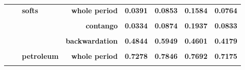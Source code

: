 \documentclass[
  authoryear,
  preprint,
  3p]{elsarticle}
\begin{document}
\begin{longtable}[t]{>{}l>{}l>{}l>{}r>{}r>{}r>{}r>{}r}
\addlinespace
\textbf{} & \textbf{} & \textbf{softs} & \textbf{whole period} & \textcolor[HTML]{4285f4}{\textbf{0.0391}} & \textcolor[HTML]{4285f4}{\textbf{0.0853}} & \textcolor[HTML]{4285f4}{\textbf{0.1584}} & \textcolor[HTML]{4285f4}{\textbf{0.0764}}\\
\textbf{\cellcolor{gray!10}{}} & \textbf{\cellcolor{gray!10}{}} & \textbf{\cellcolor{gray!10}{}} & \textbf{\cellcolor{gray!10}{backwardation}} & \textcolor[HTML]{4285f4}{\textbf{\cellcolor{gray!10}{0.0437}}} & \textcolor[HTML]{4285f4}{\textbf{\cellcolor{gray!10}{0.0845}}} & \textcolor[HTML]{4285f4}{\textbf{\cellcolor{gray!10}{0.1210}}} & \textcolor[HTML]{4285f4}{\textbf{\cellcolor{gray!10}{0.0685}}}\\
\textbf{} & \textbf{} & \textbf{} & \textbf{contango} & \textcolor[HTML]{4285f4}{\textbf{0.0334}} & \textcolor[HTML]{4285f4}{\textbf{0.0874}} & \textcolor[HTML]{4285f4}{\textbf{0.1937}} & \textcolor[HTML]{4285f4}{\textbf{0.0833}}\\
\textbf{\cellcolor{gray!10}{}} & \textbf{\cellcolor{gray!10}{energy}} & \textbf{\cellcolor{gray!10}{all}} & \textbf{\cellcolor{gray!10}{whole period}} & \textcolor[HTML]{4285f4}{\textbf{\cellcolor{gray!10}{0.4908}}} & \textcolor[HTML]{4285f4}{\textbf{\cellcolor{gray!10}{0.5892}}} & \textcolor[HTML]{4285f4}{\textbf{\cellcolor{gray!10}{0.4687}}} & \textcolor[HTML]{4285f4}{\textbf{\cellcolor{gray!10}{0.4203}}}\\
\textbf{} & \textbf{} & \textbf{} & \textbf{backwardation} & \textcolor[HTML]{4285f4}{\textbf{0.4844}} & \textcolor[HTML]{4285f4}{\textbf{0.5949}} & \textcolor[HTML]{4285f4}{\textbf{0.4601}} & \textcolor[HTML]{4285f4}{\textbf{0.4179}}\\
\addlinespace
\textbf{\cellcolor{gray!10}{}} & \textbf{\cellcolor{gray!10}{}} & \textbf{\cellcolor{gray!10}{}} & \textbf{\cellcolor{gray!10}{contango}} & \textcolor[HTML]{4285f4}{\textbf{\cellcolor{gray!10}{0.4957}}} & \textcolor[HTML]{4285f4}{\textbf{\cellcolor{gray!10}{0.5869}}} & \textcolor[HTML]{4285f4}{\textbf{\cellcolor{gray!10}{0.4779}}} & \textcolor[HTML]{4285f4}{\textbf{\cellcolor{gray!10}{0.4210}}}\\
\textbf{} & \textbf{} & \textbf{petroleum} & \textbf{whole period} & \textcolor[HTML]{4285f4}{\textbf{0.7278}} & \textcolor[HTML]{4285f4}{\textbf{0.7846}} & \textcolor[HTML]{4285f4}{\textbf{0.7692}} & \textcolor[HTML]{4285f4}{\textbf{0.7175}}\\
\textbf{\cellcolor{gray!10}{}} & \textbf{\cellcolor{gray!10}{}} & \textbf{\cellcolor{gray!10}{}} & \textbf{\cellcolor{gray!10}{backwardation}} & \textcolor[HTML]{4285f4}{\textbf{\cellcolor{gray!10}{0.6962}}} & \textcolor[HTML]{4285f4}{\textbf{\cellcolor{gray!10}{0.7854}}} & \textcolor[HTML]{4285f4}{\textbf{\cellcolor{gray!10}{0.7727}}} & \textcolor[HTML]{4285f4}{\textbf{\cellcolor{gray!10}{0.7282}}}\\

\end{longtable}
\end{document}
